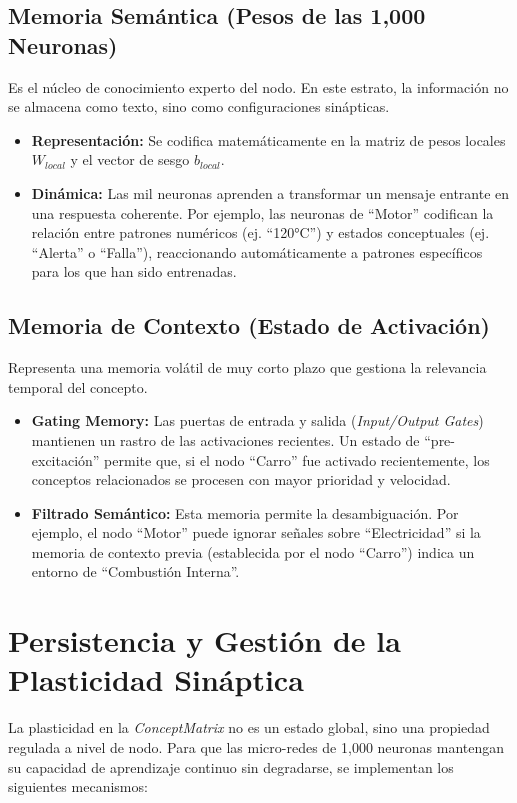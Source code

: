 \documentclass[12pt]{article}
\begin{document}
\subsection{Memoria Semántica (Pesos de las 1,000 Neuronas)}
Es el núcleo de conocimiento experto del nodo. En este estrato, la información no se almacena como texto, sino como configuraciones sinápticas.
\begin{itemize}
    \item \textbf{Representación:} Se codifica matemáticamente en la matriz de pesos locales $W_{local}$ y el vector de sesgo $b_{local}$.
    \item \textbf{Dinámica:} Las mil neuronas aprenden a transformar un mensaje entrante en una respuesta coherente. Por ejemplo, las neuronas de ``Motor'' codifican la relación entre patrones numéricos (ej. ``120°C'') y estados conceptuales (ej. ``Alerta'' o ``Falla''), reaccionando automáticamente a patrones específicos para los que han sido entrenadas.
\end{itemize}



\subsection{Memoria de Contexto (Estado de Activación)}
Representa una memoria volátil de muy corto plazo que gestiona la relevancia temporal del concepto.
\begin{itemize}
    \item \textbf{Gating Memory:} Las puertas de entrada y salida (\textit{Input/Output Gates}) mantienen un rastro de las activaciones recientes. Un estado de ``pre-excitación'' permite que, si el nodo ``Carro'' fue activado recientemente, los conceptos relacionados se procesen con mayor prioridad y velocidad.
    \item \textbf{Filtrado Semántico:} Esta memoria permite la desambiguación. Por ejemplo, el nodo ``Motor'' puede ignorar señales sobre ``Electricidad'' si la memoria de contexto previa (establecida por el nodo ``Carro'') indica un entorno de ``Combustión Interna''.
\end{itemize}




\section{Persistencia y Gestión de la Plasticidad Sináptica}

La plasticidad en la \textit{ConceptMatrix} no es un estado global, sino una propiedad regulada a nivel de nodo. Para que las micro-redes de 1,000 neuronas mantengan su capacidad de aprendizaje continuo sin degradarse, se implementan los siguientes mecanismos:
\end{document}
